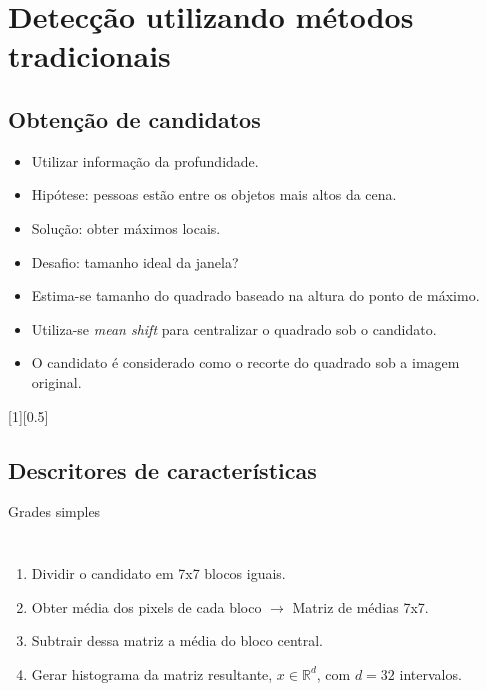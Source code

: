 \section{Detecção utilizando métodos tradicionais}

\subsection{Obtenção de candidatos}	
	\begin{frame}{\insertsubsection}	
		\begin{itemize}
		\item<1-> Utilizar informação da profundidade.
		\item<2-> Hipótese: pessoas estão entre os objetos mais altos da cena.
		\item<2-> Solução: obter máximos locais.
		\item<3-> Desafio: tamanho ideal da janela?
		\end{itemize}

	\end{frame}

	\begin{frame}{\insertsubsection}	
		\begin{itemize}
		\item Estima-se tamanho do quadrado baseado na altura do ponto de máximo. 
		\item Utiliza-se \emph{mean shift} para centralizar o quadrado sob o candidato.
		\item O candidato é considerado como o recorte do quadrado sob a imagem original.
		\end{itemize}
		[1][0.5]
	\end{frame}

\subsection{Descritores de características}
	\begin{frame}{Grades simples}
		\begin{columns}
		\begin{enumerate}
			\item Dividir o candidato em 7x7 blocos iguais. 
			\item Obter média dos pixels de cada bloco $\rightarrow$ Matriz de médias 7x7.
			\item Subtrair dessa matriz a média do bloco central.
			\item Gerar histograma da matriz resultante, $x \in \mathbb{R}^d$, com $d=32$ intervalos.
		\end{enumerate}
		\end{columns}
	\end{frame}

